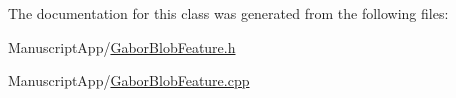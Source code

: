 The documentation for this class was generated from the following files\+:\begin{DoxyCompactItemize}
\item 
Manuscript\+App/\hyperlink{_gabor_blob_feature_8h}{Gabor\+Blob\+Feature.\+h}\item 
Manuscript\+App/\hyperlink{_gabor_blob_feature_8cpp}{Gabor\+Blob\+Feature.\+cpp}\end{DoxyCompactItemize}
